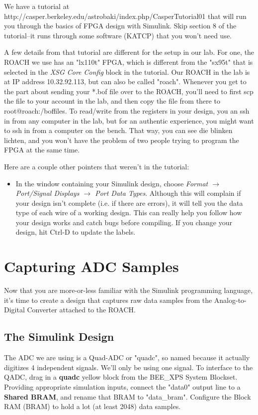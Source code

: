 \documentclass[11pt]{article}
\begin{document}
We have a tutorial at http://casper.berkeley.edu/astrobaki/index.php/CasperTutorial01
that will run you through the basics of FPGA design with Simulink.  Skip section 8 of
the tutorial--it runs through some software (KATCP) that you won't need use.

A few details from that tutorial are different for the setup in our lab.  For one, 
the ROACH we use has an "lx110t" FPGA, which is different from the "sx95t" that is
selected in the {\it XSG Core Config} block in the tutorial. 
Our ROACH in the lab is at IP address 10.32.92.113, but can also be called "roach".  
Whenever you get to the part about
sending your *.bof file over to the ROACH, you'll need to first scp the file to 
your account in the lab, and then copy the file from there to root@roach:/boffiles.
To read/write from the registers in your design, you an ssh in from any computer in the lab,
but for an authentic experience, you might want to ssh in from a computer on the bench.
That way, you can see die blinken lichten, and you won't have the problem of two people
trying to program the FPGA at the same time.

Here are a couple other pointers that weren't in the tutorial:
\begin{itemize}
\item In the window containing your Simulink design, choose {\it Format $\rightarrow$ 
Port/Signal Displays $\rightarrow$ Port Data Types}.  Although this will complain
if your design isn't complete (i.e. if there are errors), it will tell you the data
type of each wire of a working design.  This can really help you follow how your
design works and catch bugs before compiling.  If you change your design, hit Ctrl-D
to update the labels.
\end{itemize}

\section{Capturing ADC Samples}

Now that you are more-or-less familiar with the Simulink programming language, it's
time to create a design that captures raw data samples from the Analog-to-Digital
Converter attached to the ROACH.

\subsection{The Simulink Design}

The ADC we are using is a Quad-ADC or "quadc", so named because it actually digitizes
4 independent signals.  We'll only be using one signal.  To interface to the QADC, drag in a
{\bf quadc} yellow block from the BEE\_XPS System Blockset.  Providing appropriate simulation inputs,
connect the "data0" output line to a {\bf Shared BRAM}, and rename that BRAM to "data\_bram".
Configure the Block RAM (BRAM) to hold a lot (at least 2048) data samples.  
\end{document}
